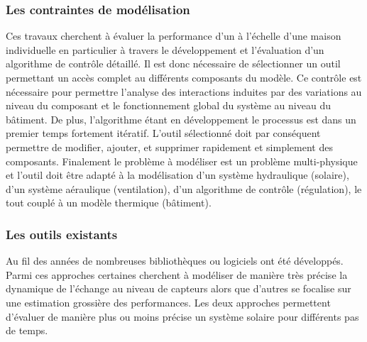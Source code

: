 \subsubsection{Les contraintes de modélisation} %
\label{ssub:les_contraintes_de_modelisation}
Ces travaux cherchent à évaluer la performance d’un  à l’échelle d’une maison
individuelle en particulier à travers le développement et l’évaluation d’un algorithme de
contrôle détaillé. Il est donc nécessaire de sélectionner un outil permettant un accès
complet au différents composants du modèle. Ce contrôle est nécessaire pour permettre
l’analyse des interactions induites par des variations au niveau du composant et le
fonctionnement global du système au niveau du bâtiment. De plus, l’algorithme étant en
développement le processus est dans un premier temps fortement itératif. L’outil
sélectionné doit par conséquent permettre de modifier, ajouter, et supprimer rapidement et
simplement des composants. Finalement le problème à modéliser est un problème multi-physique
et l’outil doit être adapté à la modélisation d’un système hydraulique (solaire),
d’un système aéraulique (ventilation), d’un algorithme de contrôle (régulation), le tout
couplé à un modèle thermique (bâtiment).


\subsubsection{Les outils existants} %
\label{ssub:les_outils_existants}
Au fil des années de nombreuses bibliothèques ou logiciels ont été développés. Parmi ces
approches certaines cherchent à modéliser de manière très précise la dynamique de
l’échange au niveau de capteurs alors que d’autres se focalise sur une estimation
grossière des performances. Les deux approches permettent d’évaluer de manière plus ou
moins précise un système solaire pour différents pas de temps.

